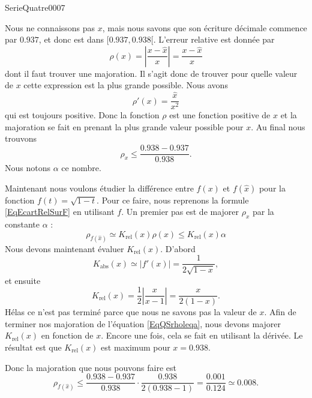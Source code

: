 
\begin{corrige}{SerieQuatre0007}

	Nous ne connaissons pas $x$, mais nous savons que son écriture décimale commence par $0.937$, et donc est dans $\mathopen[ 0.937 , 0.938 [$. L'erreur relative est donnée par
	\begin{equation}
		\rho(x)=\left| \frac{ x-\hat x }{ x }\right|=\frac{ x-\hat x }{ x }
	\end{equation}
	dont il faut trouver une majoration. Il s'agit donc de trouver pour quelle valeur de $x$ cette expression est la plus grande possible. Nous avons
	\begin{equation}
		\rho'(x)=\frac{ \hat x }{ x^2 }
	\end{equation}
	qui est toujours positive. Donc la fonction $\rho$ est une fonction positive de $x$ et la majoration se fait en prenant la plus grande valeur possible pour $x$. Au final nous trouvons
	\begin{equation}
		\rho_x\leq \frac{ 0.938-0.937 }{ 0.938 }.
	\end{equation}
	Nous notons $\alpha$ ce nombre.

	Maintenant nous voulons étudier la différence entre $f(x)$ et $f(\hat x)$ pour la fonction $f(t)=\sqrt{1-t}$. Pour ce faire, nous reprenons la formule \eqref{EqEcartRelSurF} en utilisant $f$. Un premier pas est de majorer $\rho_x$ par la constante $\alpha$ :
	\begin{equation}		\label{EqQSrholeqa}
		\rho_{f(\hat x)}\simeq K_{\text{rel}}(x)\rho(x)\leq K_{\text{rel}}(x)\alpha
	\end{equation}
	Nous devons maintenant évaluer $K_{\text{rel}}(x)$. D'abord
	\begin{equation}
		K_{\text{abs}}(x)\simeq| f'(x) |=\frac{1}{ 2\sqrt{1-x} },
	\end{equation}
	et ensuite
	\begin{equation}
		K_{\text{rel}}(x)=\frac{ 1}{2}\left| \frac{ x }{ x-1 } \right| =\frac{ x }{ 2(1-x) }.
	\end{equation}
	Hélas ce n'est pas terminé parce que nous ne savons pas la valeur de $x$. Afin de terminer nos majoration de l'équation \eqref{EqQSrholeqa}, nous devons majorer $K_{\text{rel}}(x)$ en fonction de $x$. Encore une fois, cela se fait en utilisant la dérivée. Le résultat est que $K_{\text{rel}}(x)$ est maximum pour $x=0.938$.

	Donc la majoration que nous pouvons faire est
	\begin{equation}
		\rho_{f(\hat x)}\leq \frac{ 0.938-0.937 }{ 0.938 }\cdot \frac{ 0.938 }{ 2(0.938-1) }=\frac{ 0.001 }{ 0.124 }\simeq 0.008.
	\end{equation}

\end{corrige}

